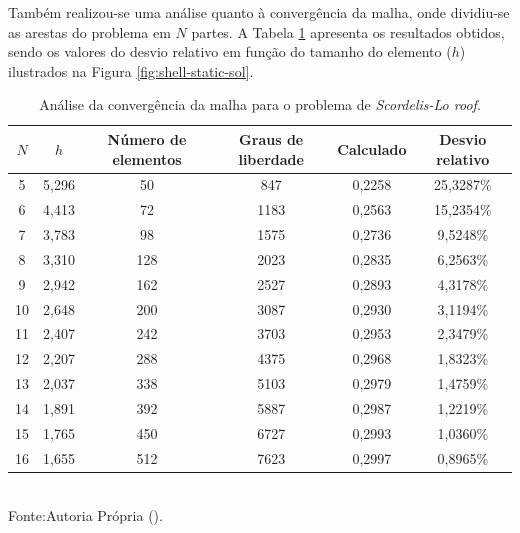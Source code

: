 Também realizou-se uma análise quanto à convergência da malha, onde dividiu-se as arestas do problema em $N$ partes. A Tabela \ref{tab:scordelis-sol} apresenta os resultados obtidos, sendo os valores do desvio relativo em função do tamanho do elemento ($h$) ilustrados na Figura \ref{fig:shell-static-sol}.

\begin{table}[h!]
    \centering
    \caption{Análise da convergência da malha para o problema de \textit{Scordelis-Lo roof}.}
    \begin{tabular}{cccccc}
        \hline
        $N$ & $h$   & Número de elementos & Graus de liberdade & Calculado & Desvio relativo \\\hline
        5   & 5,296 & 50                  & 847                & 0,2258    & 25,3287\%       \\
        6   & 4,413 & 72                  & 1183               & 0,2563    & 15,2354\%       \\
        7   & 3,783 & 98                  & 1575               & 0,2736    & 9,5248\%        \\
        8   & 3,310 & 128                 & 2023               & 0,2835    & 6,2563\%        \\
        9   & 2,942 & 162                 & 2527               & 0,2893    & 4,3178\%        \\
        10  & 2,648 & 200                 & 3087               & 0,2930    & 3,1194\%        \\
        11  & 2,407 & 242                 & 3703               & 0,2953    & 2,3479\%        \\
        12  & 2,207 & 288                 & 4375               & 0,2968    & 1,8323\%        \\
        13  & 2,037 & 338                 & 5103               & 0,2979    & 1,4759\%        \\
        14  & 1,891 & 392                 & 5887               & 0,2987    & 1,2219\%        \\
        15  & 1,765 & 450                 & 6727               & 0,2993    & 1,0360\%        \\
        16  & 1,655 & 512                 & 7623               & 0,2997    & 0,8965\%        \\\hline
    \end{tabular}
    \\Fonte:Autoria Própria (\the\year).
    \label{tab:scordelis-sol}
\end{table}

